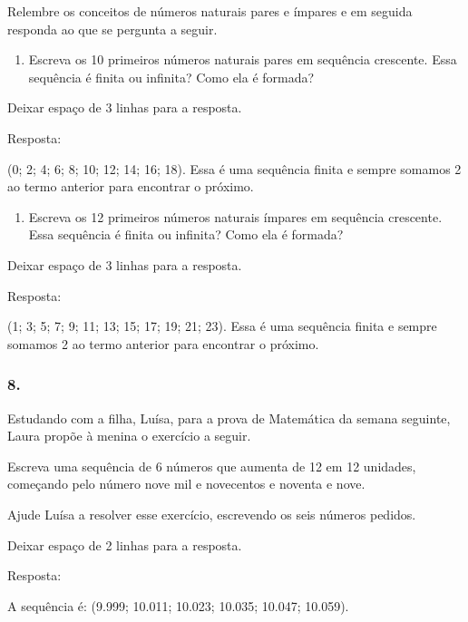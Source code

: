 \begin{enumerate}
\begin{escolha}
\begin{enumerate}
Relembre os conceitos de números naturais pares e ímpares e em seguida
responda ao que se pergunta a seguir.

\begin{enumerate}
\def\labelenumi{\alph{enumi})}
\item
  Escreva os 10 primeiros números naturais pares em sequência crescente.
  Essa sequência é finita ou infinita? Como ela é formada?
\end{enumerate}

Deixar espaço de 3 linhas para a resposta.

Resposta:

(0; 2; 4; 6; 8; 10; 12; 14; 16; 18). Essa é uma sequência finita e sempre
somamos 2 ao termo anterior para encontrar o próximo.

\begin{enumerate}
\def\labelenumi{\alph{enumi})}
\item
  Escreva os 12 primeiros números naturais ímpares em sequência
  crescente. Essa sequência é finita ou infinita? Como ela é formada?
\end{enumerate}

Deixar espaço de 3 linhas para a resposta.

Resposta:

(1; 3; 5; 7; 9; 11; 13; 15; 17; 19; 21; 23). Essa é uma sequência finita
e sempre somamos 2 ao termo anterior para encontrar o próximo.


\subsubsection{8.}\label{section-33}

Estudando com a filha, Luísa, para a prova de Matemática da semana seguinte,
Laura propõe à menina o exercício a seguir.

Escreva uma sequência de 6 números que aumenta de 12 em 12 unidades,
começando pelo número nove mil e novecentos e noventa e nove.

Ajude Luísa a resolver esse exercício, escrevendo os seis números
pedidos.

Deixar espaço de 2 linhas para a resposta.

Resposta:

A sequência é: (9.999; 10.011; 10.023; 10.035; 10.047; 10.059).


\end{enumerate}
\end{escolha}
\end{enumerate}
